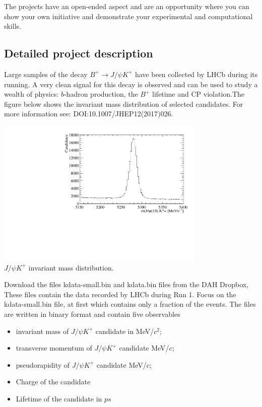 The projects have an open-ended aspect and are an opportunity where you can show your own initiative and demonstrate your experimental and computational skills.




\subsection{Detailed project description}
%
Large samples of the decay $B^+ \rightarrow J/\psi K^+$ have been collected by LHCb during its running. A very clean signal for this decay is observed and can be used to study a wealth of physics: $b$-hadron production, the $B^+$ lifetime and CP violation.The figure below shows the invariant mass distribution of selected candidates.
For more information see: {DOI:10.1007/JHEP12(2017)026}. 
%
\begin{center}
\includegraphics[width=0.75\textwidth]{figs/bmass.pdf}\\
{\small $J/\psi K^+$ invariant mass distribution.}
\end{center}
%

Download the files kdata-small.bin and kdata.bin files  from the DAH Dropbox, 
These files contain the data recorded by LHCb during Run 1. Focus on the kdata-small.bin file,  at first which contains only a fraction of the events. 
The files are written in binary format and contain five observables
\begin{itemize}
\item  invariant mass of $J/\psi K^+$  candidate  in  MeV/$c^2$;
\item transverse momentum of  $J/\psi K^+$   candidate  MeV/$c$;
\item pseudorapidity of  $J/\psi K^+$   candidate  MeV/$c$;
\item Charge of the  candidate
\item Lifetime of the candidate in $ps$
\end{itemize}

